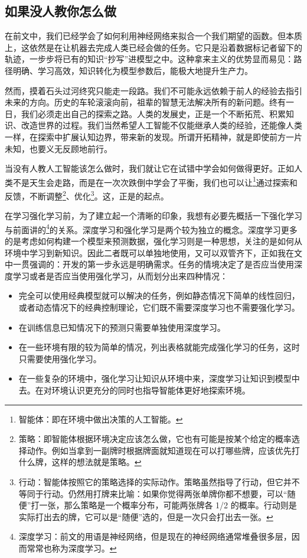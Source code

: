 \newpage

\subsection{如果没人教你怎么做}

在前文中，我们已经学会了如何利用神经网络来拟合一个我们期望的函数。但本质上，这依然是在让机器去完成人类已经会做的任务。它只是沿着数据标记者留下的轨迹，一步步将已有的知识“抄写”进模型之中。这种拿来主义的优势显而易见：路径明确、学习高效，知识转化为模型参数后，能极大地提升生产力。

然而，摸着石头过河终究只能走一段路。我们不可能永远依赖于前人的经验去指引未来的方向。历史的车轮滚滚向前，祖辈的智慧无法解决所有的新问题。终有一日，我们必须走出自己的探索之路。人类的发展史，正是一个不断拓荒、积累知识、改造世界的过程。我们当然希望人工智能不仅能继承人类的经验，还能像人类一样，在探索中扩展认知边界，带来新的发现。所谓开拓精神，就是即使前方一片未知，也要义无反顾地前行。

当没有人教人工智能该怎么做时，我们就让它在试错中学会如何做得更好。正如人类不是天生会走路，而是在一次次跌倒中学会了平衡，我们也可以让\footnote{智能体：即在环境中做出决策的人工智能。}通过探索和反馈，不断调整\footnote{策略：即智能体根据环境决定应该怎么做，它也有可能是按某个给定的概率选择动作。例如当拿到一副牌时根据牌面就知道现在可以打哪些牌，应该优先打什么牌，这样的想法就是策略。}、优化\footnote{行动：智能体按照它的策略选择的实际动作。策略虽然指导了行动，但它并不等同于行动。仍然用打牌来比喻：如果你觉得两张单牌你都不想要，可以“随便”打一张，那么策略是一个概率分布，可能两张牌各 1/2 的概率。行动则是实际打出去的牌，它可以是“随便”选的，但是一次只会打出去一张。}。这，正是的起点。

在学习强化学习前，为了建立起一个清晰的印象，我想有必要先概括一下强化学习与前面讲的\footnote{深度学习：前文的用语是神经网络，但是现在的神经网络通常堆叠很多层，因而常常也称为深度学习。}的关系。深度学习和强化学习是两个较为独立的概念。深度学习更多的是考虑如何构建一个模型来预测数据，强化学习则是一种思想，关注的是如何从环境中学习到新知识。因此二者既可以单独地使用，又可以双管齐下，正如我在文中一贯强调的：开发的第一步永远是明确需求。任务的情境决定了是否应当使用深度学习或者是否应当使用强化学习，从而划分出来四种情况：
\begin{itemize}
    \item 完全可以使用经典模型就可以解决的任务，例如静态情况下简单的线性回归，或者动态情况下的经典控制理论，它们既不需要深度学习也不需要强化学习。
    \item 在训练信息已知情况下的预测只需要单独使用深度学习。
    \item 在一些环境有限的较为简单的情况，列出表格就能完成强化学习的任务，这时只需要使用强化学习。
    \item 在一些复杂的环境中，强化学习让知识从环境中来，深度学习让知识到模型中去。在对环境认识更充分的同时也指导智能体更好地探索环境。
\end{itemize}

